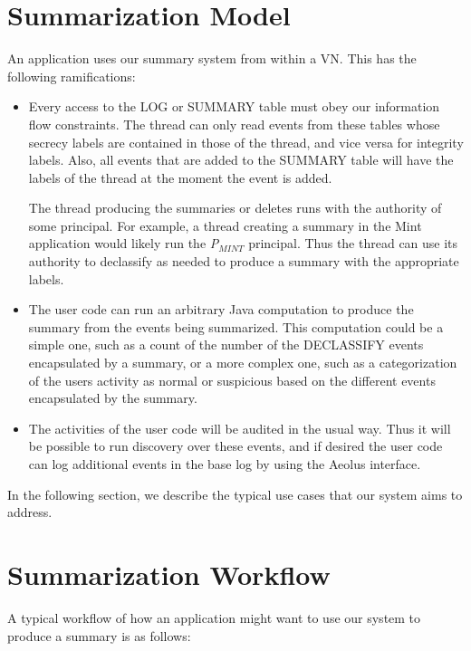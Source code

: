 \section{Summarization Model}

An application uses our summary system from within a VN. This has the following ramifications:

\begin{itemize}
  \item Every access to the LOG or SUMMARY table must obey our information flow constraints. The thread can only read events from these tables whose secrecy labels are contained in those of the thread, and vice versa for integrity labels. Also, all events that are added to the SUMMARY table will have the labels of the thread at the moment the event is added.

The thread producing the summaries or deletes runs with the authority of some principal. For example, a thread creating a summary in the Mint application would likely run the \emph{P$_{MINT}$} principal. Thus the thread can use its authority to declassify as needed to produce a summary with the appropriate labels.
  \item The user code can run an arbitrary Java computation to produce the summary from the events being summarized. This computation could be a simple one, such as a count of the number of the DECLASSIFY events encapsulated by a summary, or a more complex one, such as a categorization of the users activity as normal or suspicious based on the different events encapsulated by the summary.
  \item The activities of the user code will be audited in the usual way. Thus it will be possible to run discovery over these events, and if desired the user code can log additional events in the base log by using the Aeolus interface.
\end{itemize}

\noindent
In the following section, we describe the typical use cases that our system aims to address.

\section{Summarization Workflow}

A typical workflow of how an application might want to use our system to produce a summary is as follows:


